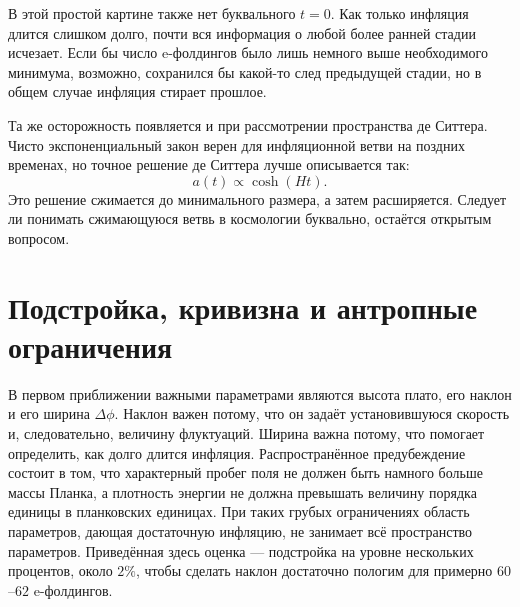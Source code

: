 В этой простой картине также нет буквального \(t=0\). Как только инфляция длится слишком долго, почти вся информация о любой более ранней стадии исчезает. Если бы число e-фолдингов было лишь немного выше необходимого минимума, возможно, сохранился бы какой-то след предыдущей стадии, но в общем случае инфляция стирает прошлое.

Та же осторожность появляется и при рассмотрении пространства де Ситтера. Чисто экспоненциальный закон верен для инфляционной ветви на поздних временах, но точное решение де Ситтера лучше описывается так:
\begin{equation}
a(t)\propto \cosh(Ht).
\end{equation}
Это решение сжимается до минимального размера, а затем расширяется. Следует ли понимать сжимающуюся ветвь в космологии буквально, остаётся открытым вопросом.

\begin{classroomqa}
\end{classroomqa}

\section{Подстройка, кривизна и антропные ограничения}

В первом приближении важными параметрами являются высота плато, его наклон и его ширина \(\Delta\phi\). Наклон важен потому, что он задаёт установившуюся скорость и, следовательно, величину флуктуаций. Ширина важна потому, что помогает определить, как долго длится инфляция. Распространённое предубеждение состоит в том, что характерный пробег поля не должен быть намного больше массы Планка, а плотность энергии не должна превышать величину порядка единицы в планковских единицах. При таких грубых ограничениях область параметров, дающая достаточную инфляцию, не занимает всё пространство параметров. Приведённая здесь оценка — подстройка на уровне нескольких процентов, около \(2\%\), чтобы сделать наклон достаточно пологим для примерно \(60\)–\(62\) e-фолдингов.

